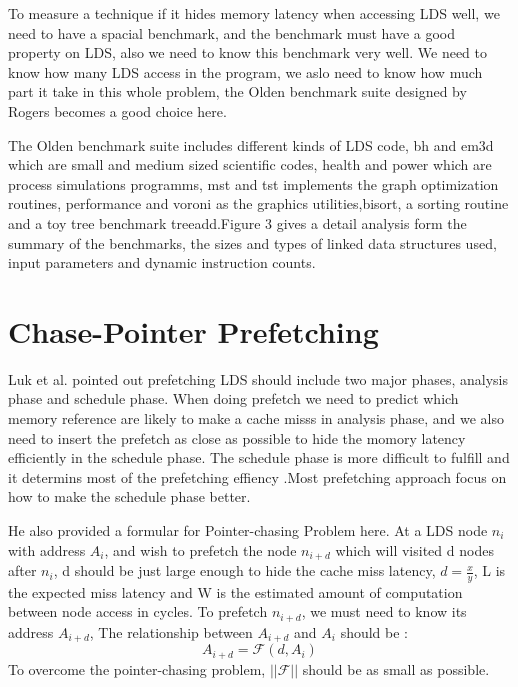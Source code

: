 \documentclass{acm_proc_article-sp}
\begin{document}
To measure a technique if it hides memory latency when accessing LDS well,
we need to have a spacial benchmark, and the benchmark must have 
a good property on LDS, also we need to know this benchmark very
well. We need to know how many LDS access in the program, we aslo need
to know how much part it take in this whole problem, the Olden
benchmark suite designed by Rogers becomes a good choice
here.\cite{Rogers:1995:SDD:201059.201065}  

The Olden benchmark suite includes different kinds of LDS code, 
bh and em3d which are small and medium sized scientific codes, health
and power which are process simulations programms, mst and tst
implements the graph optimization routines, performance and voroni as
the graphics utilities,bisort, a sorting routine and a toy tree
benchmark treeadd.Figure 3 gives a detail analysis form  the summary of the
benchmarks, the sizes and types of linked data structures used, input
parameters and dynamic instruction counts.  

\section{Chase-Pointer Prefetching}

Luk et al. pointed out prefetching LDS should include two major
phases, analysis phase and schedule phase. When doing prefetch
we need to predict which memory reference are likely to make a
cache misss in analysis phase, and we also need to
insert the prefetch as close as possible to hide the momory latency
efficiently in the schedule phase. 
The schedule phase is more difficult to fulfill and it  determins most
of the prefetching effiency .\cite{Luk:1996:CPR:248208.237190}Most
prefetching approach focus on how to make the schedule phase better. 
 
He also provided a formular for Pointer-chasing Problem here.
At a LDS node $n_i$ with address $A_i$, and wish to prefetch the node
$n_{i+d}$ which will visited d nodes after $n_i$, d should be just
large enough to hide the cache miss latency, $d=\frac{x}{y}$, L is the
expected miss latency and W is the estimated amount of computation
between node access in cycles. To prefetch $n_{i+d}$, we must need to
know its address $A_{i+d}$, The relationship between $A_{i+d}$ and
$A_{i}$ should be : 
\begin{displaymath}
A_{i+d}= \mathcal{F}(d,A_i)
\end{displaymath}
To overcome the pointer-chasing problem, $||\mathcal{F}||$ should be
as small as possible.
\end{document}
